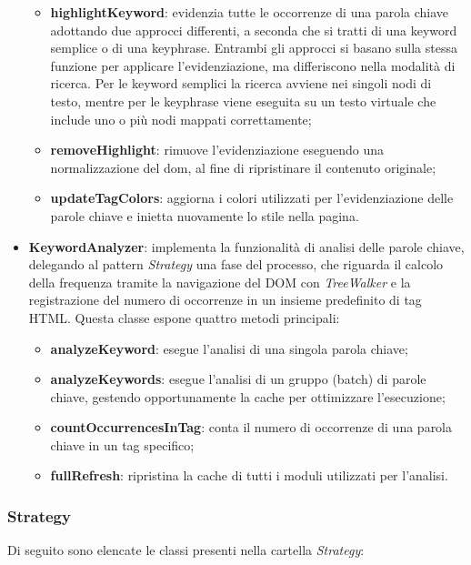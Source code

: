 \begin{itemize}
\begin{itemize}
    \item \textbf{highlightKeyword}: evidenzia tutte le occorrenze di una parola chiave adottando due approcci differenti, a seconda che si tratti di una keyword semplice o di una keyphrase. Entrambi gli approcci si basano sulla stessa funzione per applicare l’evidenziazione, ma differiscono nella modalità di ricerca. Per le keyword semplici la ricerca avviene nei singoli nodi di testo, mentre per le keyphrase viene eseguita su un testo virtuale che include uno o più nodi mappati correttamente;
    \item \textbf{removeHighlight}: rimuove l’evidenziazione eseguendo una normalizzazione del \gls{dom}, al fine di ripristinare il contenuto originale;
    \item \textbf{updateTagColors}: aggiorna i colori utilizzati per l’evidenziazione delle parole chiave e inietta nuovamente lo stile nella pagina.
  \end{itemize}
  \item \textbf{KeywordAnalyzer}: implementa la funzionalità di analisi delle parole chiave, delegando al pattern \textit{Strategy} una fase del processo, che riguarda il calcolo della frequenza tramite la navigazione del DOM con \textit{TreeWalker} e la registrazione del numero di occorrenze in un insieme predefinito di tag HTML. Questa classe espone quattro metodi principali:
  \begin{itemize}
    \item \textbf{analyzeKeyword}: esegue l’analisi di una singola parola chiave;
    \item \textbf{analyzeKeywords}: esegue l’analisi di un gruppo (batch) di parole chiave, gestendo opportunamente la cache per ottimizzare l’esecuzione;
    \item \textbf{countOccurrencesInTag}: conta il numero di occorrenze di una parola chiave in un tag specifico;
    \item \textbf{fullRefresh}: ripristina la cache di tutti i moduli utilizzati per l’analisi.
  \end{itemize}
\end{itemize}

\subsubsection{Strategy}

\par Di seguito sono elencate le classi presenti nella cartella \textit{Strategy}:

